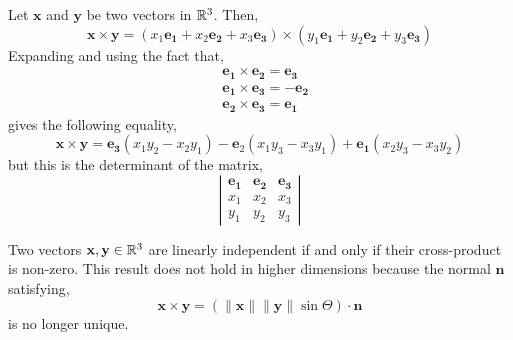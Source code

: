 \begin{rmk}
Let $\mathbf{x}$ and $\mathbf{y}$ be two vectors in $\mathbb{R}^3$. Then,
\[\mathbf{x} \times \mathbf{y}
    =\left(x_1 \mathbf{e_1}+x_2 \mathbf{e_2}+ x_3 \mathbf{e_3}\right) \times \left(y_1 \mathbf{e_1}+y_2 \mathbf{e_2}+y_3 \mathbf{e_3}\right)\]
Expanding and using the fact that,
\begin{align*}
    &\mathbf{e_1} \times \mathbf{e_2} = \mathbf{e_3} \\
    &\mathbf{e_1} \times \mathbf{e_3} = -\mathbf{e_2} \\
    &\mathbf{e_2} \times \mathbf{e_3} = \mathbf{e_1}
\end{align*}
gives the following equality,
\[\mathbf{x} \times \mathbf{y}
    =\mathbf{e_3}\left(x_1 y_2-x_2 y_1\right) -\mathbf{e}_2\left(x_1 y_3-x_3 y_1\right) + \mathbf{e_1}\left(x_2 y_3-x_3 y_2\right)\]
but this is the determinant of the matrix,
\[\left|\begin{array}{ccc}
    \mathbf{e_1} & \mathbf{e_2} & \mathbf{e_3} \\
    x_1 & x_2 & x_3 \\
    y_1 & y_2 & y_3
    \end{array}\right|\]
\end{rmk}

\begin{cor}
   \sloppy  Two vectors $\mathbf{x}, \mathbf{y} \in \mathbb{R}^3$ are linearly independent if and only if their cross-product is non-zero. This result does not hold in higher dimensions because the normal $\mathbf{n}$ satisfying,
    \[\mathbf{x} \times \mathbf{y}=(\|\mathbf{x}\|\|\mathbf{y}\| \sin \Theta) \cdot \mathbf{n}\]
    is no longer unique.
\end{cor}

